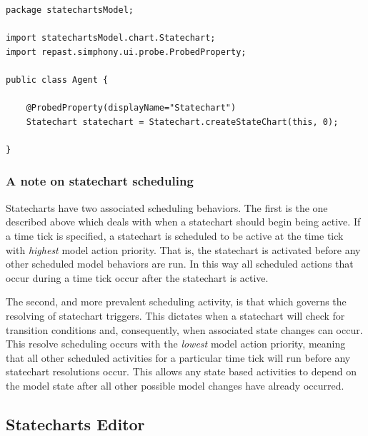 \documentclass[11pt]{amsart}
\begin{document}
\noindent\begin{minipage}[h]{\textwidth}
\vspace{.2in}
\lstset{language=java,caption=Agent class with the default injected statechart field.,label=lst:injectedStatechart}
\begin{lstlisting}
package statechartsModel;

import statechartsModel.chart.Statechart;
import repast.simphony.ui.probe.ProbedProperty;

public class Agent {

	@ProbedProperty(displayName="Statechart")
	Statechart statechart = Statechart.createStateChart(this, 0);

}
\end{lstlisting}
\vspace{.2in}
\end{minipage}

\subsubsection{A note on statechart scheduling}
Statecharts have two associated scheduling behaviors. The first is the one described above which deals with when a statechart should begin being active. If a time tick is specified, a statechart is scheduled to be active at the time tick with \emph{highest} model action priority. That is, the statechart is activated before any other scheduled model behaviors are run. In this way all scheduled actions that occur during a time tick occur after the statechart is active. 

The second, and more prevalent scheduling activity, is that which governs the resolving of statechart triggers. This dictates when a statechart will check for transition conditions and, consequently, when associated state changes can occur. This resolve scheduling occurs with the \emph{lowest} model action priority, meaning that all other scheduled activities for a particular time tick will run before any statechart resolutions occur. This allows any state based activities to depend on the model state after all other possible model changes have already occurred.








\clearpage

\subsection{Statecharts Editor}
\end{document}
